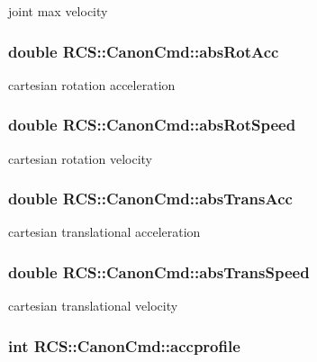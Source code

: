 joint max velocity \hypertarget{structRCS_1_1CanonCmd_ae1abe3a2d6c4c54776ad46738b3bf571}{
\subsubsection[{abs\-Rot\-Acc}]{\setlength{\rightskip}{0pt plus 5cm}double R\-C\-S\-::\-Canon\-Cmd\-::abs\-Rot\-Acc}}\label{structRCS_1_1CanonCmd_ae1abe3a2d6c4c54776ad46738b3bf571}
cartesian rotation acceleration \hypertarget{structRCS_1_1CanonCmd_ad7ce99c4f8d61314aef30c376ace79b7}{
\subsubsection[{abs\-Rot\-Speed}]{\setlength{\rightskip}{0pt plus 5cm}double R\-C\-S\-::\-Canon\-Cmd\-::abs\-Rot\-Speed}}\label{structRCS_1_1CanonCmd_ad7ce99c4f8d61314aef30c376ace79b7}
cartesian rotation velocity \hypertarget{structRCS_1_1CanonCmd_a129e91d931073194c3baaed83f56373e}{
\subsubsection[{abs\-Trans\-Acc}]{\setlength{\rightskip}{0pt plus 5cm}double R\-C\-S\-::\-Canon\-Cmd\-::abs\-Trans\-Acc}}\label{structRCS_1_1CanonCmd_a129e91d931073194c3baaed83f56373e}
cartesian translational acceleration \hypertarget{structRCS_1_1CanonCmd_abac67431174c72bbc8bc1e14916cba60}{
\subsubsection[{abs\-Trans\-Speed}]{\setlength{\rightskip}{0pt plus 5cm}double R\-C\-S\-::\-Canon\-Cmd\-::abs\-Trans\-Speed}}\label{structRCS_1_1CanonCmd_abac67431174c72bbc8bc1e14916cba60}
cartesian translational velocity \hypertarget{structRCS_1_1CanonCmd_a56e92d2a05f5ae7765d9a91eb34dcbfc}{
\subsubsection[{accprofile}]{\setlength{\rightskip}{0pt plus 5cm}int R\-C\-S\-::\-Canon\-Cmd\-::accprofile}}\label{structRCS_1_1CanonCmd_a56e92d2a05f5ae7765d9a91eb34dcbfc}
